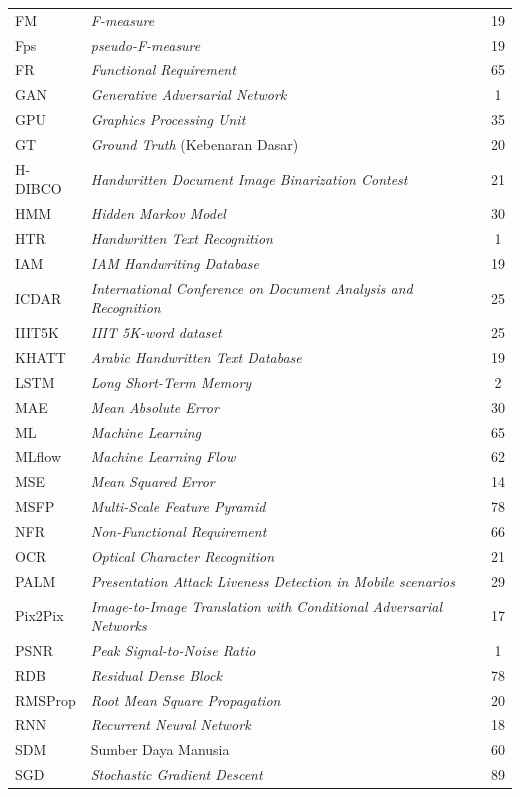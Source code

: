 \begin{longtable}{@{} l >{\raggedright\arraybackslash}p{7.5cm} c @{}}
FM & \textit{F-measure} & 19 \\
Fps & \textit{pseudo-F-measure} & 19 \\
FR & \textit{Functional Requirement} & 65 \\
GAN & \textit{Generative Adversarial Network} & 1 \\
GPU & \textit{Graphics Processing Unit} & 35 \\
GT & \textit{Ground Truth} (Kebenaran Dasar) & 20 \\
H-DIBCO & \textit{Handwritten Document Image Binarization Contest} & 21 \\
HMM & \textit{Hidden Markov Model} & 30 \\
HTR & \textit{Handwritten Text Recognition} & 1 \\
IAM & \textit{IAM Handwriting Database} & 19 \\
ICDAR & \textit{International Conference on Document Analysis and Recognition} & 25 \\
IIIT5K & \textit{IIIT 5K-word dataset} & 25 \\
KHATT & \textit{Arabic Handwritten Text Database} & 19 \\
LSTM & \textit{Long Short-Term Memory} & 2 \\
MAE & \textit{Mean Absolute Error} & 30 \\
ML & \textit{Machine Learning}  & 65 \\
MLflow & \textit{Machine Learning Flow} & 62 \\
MSE & \textit{Mean Squared Error}  & 14 \\
MSFP & \textit{Multi-Scale Feature Pyramid} & 78 \\
NFR & \textit{Non-Functional Requirement}  & 66 \\
OCR & \textit{Optical Character Recognition} & 21 \\
PALM & \textit{Presentation Attack Liveness Detection in Mobile scenarios} & 29 \\
Pix2Pix & \textit{Image-to-Image Translation with Conditional Adversarial Networks} & 17 \\
PSNR & \textit{Peak Signal-to-Noise Ratio} & 1 \\
RDB & \textit{Residual Dense Block} & 78 \\
RMSProp & \textit{Root Mean Square Propagation} & 20 \\
RNN & \textit{Recurrent Neural Network}  & 18 \\
SDM & Sumber Daya Manusia & 60 \\
SGD & \textit{Stochastic Gradient Descent} & 89 \\

\end{longtable}
